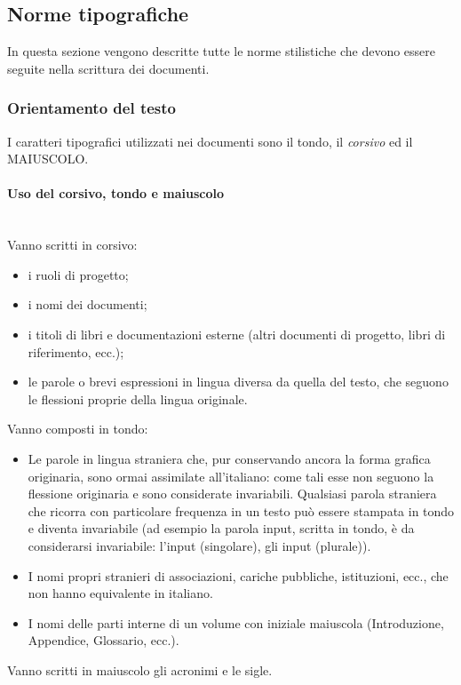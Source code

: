 \subsection{Norme tipografiche}
In questa sezione vengono descritte tutte le norme stilistiche che devono essere seguite nella scrittura dei documenti.

\subsubsection{Orientamento del testo}
I caratteri tipografici utilizzati nei documenti sono il tondo, il \textit{corsivo} ed il MAIUSCOLO.

\paragraph{Uso del corsivo, tondo e maiuscolo} \label{sec:corsivo_tondo_maiuscolo} \mbox{} \\
Vanno scritti in corsivo:
\begin{itemize}
	\item i ruoli di progetto;
	\item i nomi dei documenti;
	\item i titoli di libri e documentazioni esterne (altri documenti di progetto, libri di riferimento, ecc.);
	\item le parole o brevi espressioni in lingua diversa da quella del testo, che seguono le flessioni proprie della lingua originale.
\end{itemize}
Vanno composti in tondo:
\begin{itemize}
	\item Le parole in lingua straniera che, pur conservando ancora la forma grafica originaria, sono ormai assimilate all'italiano: come tali esse non seguono la flessione originaria e sono considerate invariabili. Qualsiasi parola straniera che ricorra con particolare frequenza in un testo può essere stampata in tondo e diventa invariabile (ad esempio la parola input, scritta in tondo, è da considerarsi invariabile: l'input (singolare), gli input (plurale)).
	\item I nomi propri stranieri di associazioni, cariche pubbliche, istituzioni, ecc., che non hanno equivalente in italiano.
	\item I nomi delle parti interne di un volume con iniziale maiuscola (Introduzione, Appendice, Glossario, ecc.).
\end{itemize}
Vanno scritti in maiuscolo gli acronimi e le sigle.

